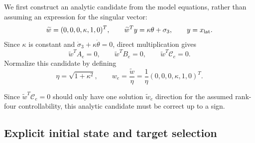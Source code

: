 We first construct an analytic candidate from the model equations,
rather than assuming an expression for the singular vector:
\begin{equation}
\widetilde w=(0,0,0,\kappa,1,0)^T,
\qquad
\widetilde w^Ty=\kappa\theta+\sigma_3,
\qquad y=x_{\rm lat}.
\end{equation}
Since $\kappa$ is constant and
$\dot\sigma_3+\kappa\dot\theta=0$, direct multiplication gives
\begin{equation}
\widetilde w^TA_e=0,\qquad \widetilde w^TB_e=0,
\qquad \widetilde w^T\mathcal C_e=0.
\end{equation}
Normalize this candidate by defining
\begin{equation}
\eta=\sqrt{1+\kappa^2},\qquad
\boxed{w_e=\frac{\widetilde w}{\eta}
=\frac{1}{\eta}(0,0,0,\kappa,1,0)^T.}
\end{equation}

Since $\widetilde w^T\mathcal C_e=0$ should only have one solution $\widetilde w_e$ direction for the assumed rank-four controllability, this analytic candidate must be correct up to a sign. 

\subsection{Explicit initial state and target selection}

